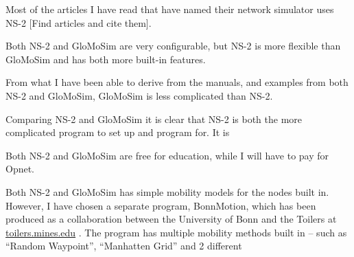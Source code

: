 Most of the articles I have read that have named their network simulator uses NS-2 [Find articles and cite them].

Both NS-2 and GloMoSim are very configurable, but NS-2 is more flexible than GloMoSim and has both more built-in features.

From what I have been able to derive from the manuals, and examples from both NS-2 and GloMoSim, GloMoSim is less complicated than NS-2.

Comparing NS-2 and GloMoSim it is clear that NS-2 is both the more complicated program to set up and program for. It is 

Both NS-2 and GloMoSim are free for education, while I will have to pay for Opnet.

Both NS-2 and GloMoSim has simple mobility models for the nodes built in. However, I have chosen a separate program, BonnMotion, which has been produced as a collaboration between the University of Bonn and the Toilers at \url{toilers.mines.edu} . The program has multiple mobility methods built in -- such as ``Random Waypoint'', ``Manhatten Grid'' and 2 different
